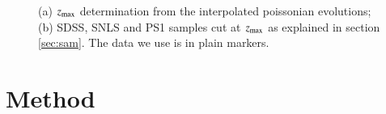 \documentclass{aa}
\begin{document}
\begin{figure}[htbp!]
    \centering
    \caption{(a) $z_{\text{max}}$ determination from the interpolated poissonian
    evolutions; (b) SDSS, SNLS and PS1 samples cut at $z_{\text{max}}$ as explained in
    section \ref{sec:sam}. The data we use is in plain markers.}
\end{figure}

\section{Method}
\end{document}
